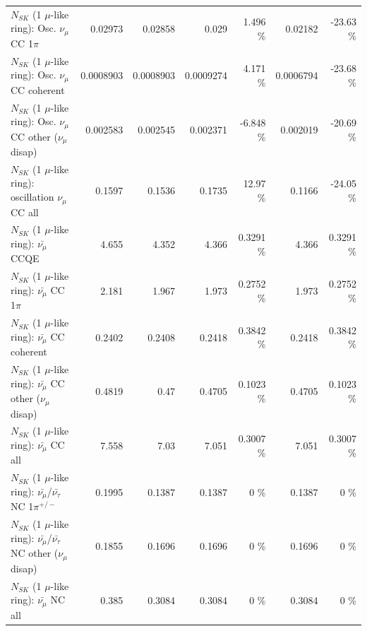 \begin{table}
\begin{tabular}{| l | r | r | r  r | r  r |}
                          $N_{SK}$ (1 $\mu$-like ring): Osc. $\nu_\mu$ CC 1$\pi$ &         0.02973 &         0.02858 &           0.029 &    1.496 \%  &         0.02182 &   -23.63 \%  \\ 
                        $N_{SK}$ (1 $\mu$-like ring): Osc. $\nu_\mu$ CC coherent &       0.0008903 &       0.0008903 &       0.0009274 &    4.171 \%  &       0.0006794 &   -23.68 \%  \\ 
         $N_{SK}$ (1 $\mu$-like ring): Osc. $\nu_\mu$ CC other ($\nu_\mu$ disap) &        0.002583 &        0.002545 &        0.002371 &   -6.848 \%  &        0.002019 &   -20.69 \%  \\ 
                      $N_{SK}$ (1 $\mu$-like ring): oscillation $\nu_\mu$ CC all &          0.1597 &          0.1536 &          0.1735 &    12.97 \%  &          0.1166 &   -24.05 \%  \\ 
\hline
\hline
                              $N_{SK}$ (1 $\mu$-like ring): $\bar{\nu_\mu}$ CCQE &           4.655 &           4.352 &           4.366 &   0.3291 \%  &           4.366 &   0.3291 \%  \\ 
                         $N_{SK}$ (1 $\mu$-like ring): $\bar{\nu_\mu}$ CC 1$\pi$ &           2.181 &           1.967 &           1.973 &   0.2752 \%  &           1.973 &   0.2752 \%  \\ 
                       $N_{SK}$ (1 $\mu$-like ring): $\bar{\nu_\mu}$ CC coherent &          0.2402 &          0.2408 &          0.2418 &   0.3842 \%  &          0.2418 &   0.3842 \%  \\ 
        $N_{SK}$ (1 $\mu$-like ring): $\bar{\nu_\mu}$ CC other ($\nu_\mu$ disap) &          0.4819 &            0.47 &          0.4705 &   0.1023 \%  &          0.4705 &   0.1023 \%  \\ 
                          $N_{SK}$ (1 $\mu$-like ring): $\bar{\nu_{\mu}}$ CC all &           7.558 &            7.03 &           7.051 &   0.3007 \%  &           7.051 &   0.3007 \%  \\ 
\hline
  $N_{SK}$ (1 $\mu$-like ring): $\bar{\nu_\mu}$/$\bar{\nu_\tau}$ NC 1$\pi^{+/-}$ &          0.1995 &          0.1387 &          0.1387 &        0 \%  &          0.1387 &        0 \%  \\ 
$N_{SK}$ (1 $\mu$-like ring): $\bar{\nu_\mu}$/$\bar{\nu_\tau}$ NC other ($\nu_\mu$ disap) &          0.1855 &          0.1696 &          0.1696 &        0 \%  &          0.1696 &        0 \%  \\ 
                          $N_{SK}$ (1 $\mu$-like ring): $\bar{\nu_{\mu}}$ NC all &           0.385 &          0.3084 &          0.3084 &        0 \%  &          0.3084 &        0 \%  \\ 

\end{tabular}
\end{table}

